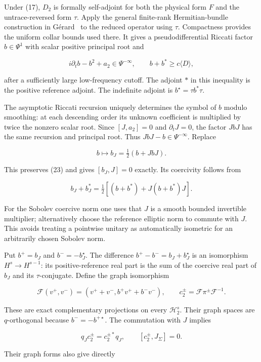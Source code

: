 Under (17), $D_2$ is formally self-adjoint for both the physical form $F$ and the untrace-reversed form $\tau$. Apply the general finite-rank Hermitian-bundle construction in G\'erard~\cite[Sections 3.1--3.2]{Gerard2024Compact} to the reduced operator using $\tau$. Compactness provides the uniform collar bounds used there. It gives a pseudodifferential Riccati factor $b\in\Psi^1$ with scalar positive principal root and

\[
 i\partial_tb-b^2+a_2\in\Psi^{-\infty},\qquad
 b+b^*\ge c\langle D\rangle,
 \tag{23}
\]

after a sufficiently large low-frequency cutoff. The adjoint $*$ in this inequality is the positive reference adjoint. The indefinite adjoint is $b^\star=\tau b^*\tau$.

The asymptotic Riccati recursion uniquely determines the symbol of $b$ modulo smoothing: at each descending order its unknown coefficient is multiplied by twice the nonzero scalar root. Since $[J,a_2]=0$ and $\partial_tJ=0$, the factor $JbJ$ has the same recursion and principal root. Thus $JbJ-b\in\Psi^{-\infty}$. Replace

\[
 b\longmapsto b_J=\tfrac12(b+JbJ).
 \tag{24}
\]

This preserves (23) and gives $[b_J,J]=0$ exactly. Its coercivity follows from

\[
 b_J+b_J^*=\tfrac12[(b+b^*)+J(b+b^*)J].
 \tag{25}
\]

For the Sobolev coercive norm one uses that $J$ is a smooth bounded invertible multiplier; alternatively choose the reference elliptic norm to commute with $J$. This avoids treating a pointwise unitary as automatically isometric for an arbitrarily chosen Sobolev norm.

Put $b^+=b_J$ and $b^-=-b_J^\star$. The difference $b^+-b^-=b_J+b_J^\star$ is an isomorphism $H^s\to H^{s-1}$: its positive-reference real part is the sum of the coercive real part of $b_J$ and its $\tau$-conjugate. Define the graph isomorphism

\[
 \mathscr F(v^+,v^-)=(v^++v^-,b^+v^++b^-v^-),
 \qquad
 c_2^\pm=\mathscr F\pi^\pm\mathscr F^{-1}.
 \tag{26}
\]

These are exact complementary projections on every $\mathcal H_2^s$. Their graph spaces are $q$-orthogonal because $b^-=-b^{+\star}$. The commutation with $J$ implies

\[
 q_Jc_2^\pm=c_2^{\pm *}q_J,\qquad [c_2^\pm,J_\Sigma]=0.
 \tag{27}
\]

Their graph forms also give directly


